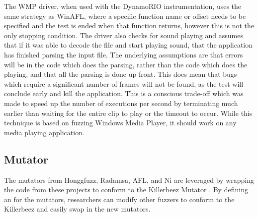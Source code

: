 The WMP driver, when used with the DynamoRIO instrumentation, uses the same strategy as WinAFL, where a specific function
name or offset needs to be specified and the test is ended when that function returns, however
this is not the only stopping condition. The driver also checks for sound
playing and assumes that if it was able to decode the file and start playing
sound, that the application has finished parsing the input file.
The underlying assumptions are that errors will be in the
code which does the parsing, rather than the code which does the playing, and that all
the parsing is done up front.  This does mean that bugs which require a
significant number of frames will not be found, as the test will conclude
early and kill the application.  This is a conscious trade-off which was made
to speed up the number of executions per second by terminating much earlier than
waiting for the entire clip to
play or the timeout to occur.  While this technique is based on fuzzing Windows Media Player,
it should work on any media playing application. 

\subsection{Mutator} \label{Mutator}
The mutators from Honggfuzz, Radamsa, AFL, and Ni are leveraged by wrapping the
code from these projects to conform to the Killerbeez Mutator \API{}. By
defining an \API{} for the mutators, researchers can modify other
fuzzers to conform to the Killerbeez \API{} and easily swap in the new mutators.

